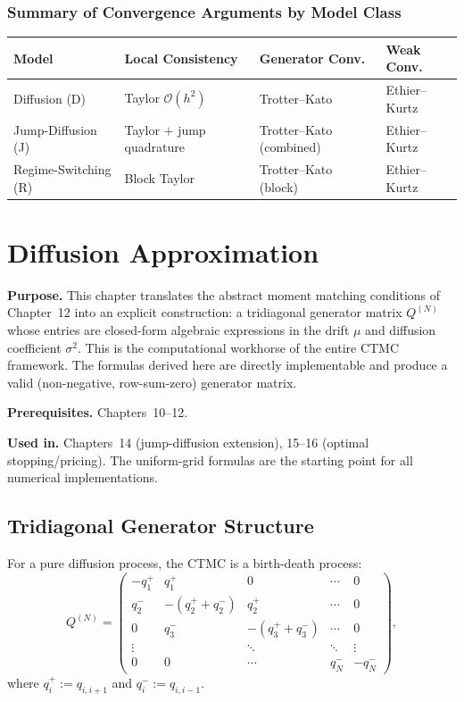 \documentclass[11pt,a4paper,openany]{book}
\theoremstyle{definition}
\theoremstyle{plain}
\theoremstyle{remark}
\newcommand{\1}{\mathbbm{1}}
\begin{document}
\subsection{Summary of Convergence Arguments by Model Class}

\begin{center}
\begin{tabular}{>{\raggedright\arraybackslash}p{3cm}>{\raggedright\arraybackslash}p{3cm}>{\raggedright\arraybackslash}p{3cm}>{\raggedright\arraybackslash}p{3cm}}
\toprule
\textbf{Model} & \textbf{Local Consistency} & \textbf{Generator Conv.} & \textbf{Weak Conv.} \\
\midrule
Diffusion (D) & Taylor $\mathcal{O}(h^{2})$ & Trotter--Kato & Ethier--Kurtz \\
Jump-Diffusion (J) & Taylor $+$ jump quadrature & Trotter--Kato (combined) & Ethier--Kurtz \\
Regime-Switching (R) & Block Taylor & Trotter--Kato (block) & Ethier--Kurtz \\
\bottomrule
\end{tabular}
\end{center}

\chapter{Diffusion Approximation}

\noindent\textbf{Purpose.} This chapter translates the abstract moment matching conditions of Chapter~12 into an explicit construction: a tridiagonal generator matrix $Q^{(N)}$ whose entries are closed-form algebraic expressions in the drift $\mu$ and diffusion coefficient $\sigma^{2}$. This is the computational workhorse of the entire CTMC framework. The formulas derived here are directly implementable and produce a valid (non-negative, row-sum-zero) generator matrix.

\textbf{Prerequisites.} Chapters~10--12.

\textbf{Used in.} Chapters~14 (jump-diffusion extension), 15--16 (optimal stopping/pricing). The uniform-grid formulas are the starting point for all numerical implementations.

\section{Tridiagonal Generator Structure}

For a pure diffusion process, the CTMC is a birth-death process:
\[
Q^{(N)} = \begin{pmatrix}
-q_{1}^{+} & q_{1}^{+} & 0 & \cdots & 0 \\
q_{2}^{-} & -(q_{2}^{+} + q_{2}^{-}) & q_{2}^{+} & \cdots & 0 \\
0 & q_{3}^{-} & -(q_{3}^{+} + q_{3}^{-}) & \cdots & 0 \\
\vdots & & \ddots & \ddots & \vdots \\
0 & 0 & \cdots & q_{N}^{-} & -q_{N}^{-}
\end{pmatrix},
\]
where $q_{i}^{+} := q_{i,i+1}$ and $q_{i}^{-} := q_{i,i-1}$.
\end{document}
